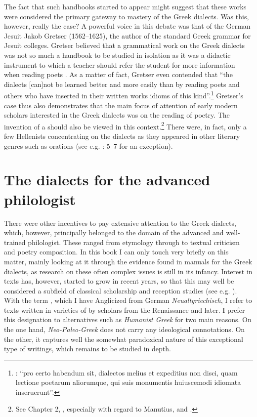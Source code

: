 The fact that such handbooks started to appear might suggest that these works were considered the primary gateway to mastery of the Greek dialects. Was this, however, really the case? A powerful voice in this debate was that of the German Jesuit Jakob Gretser (1562–1625), the author of the standard Greek grammar for Jesuit colleges. Gretser believed that a grammatical work on the Greek dialects was not so much a handbook to be studied in isolation as it was a didactic instrument to which a teacher should refer the student for more information when reading poets \citep[{\footnotesize)(}.5\textsc{\textsuperscript{v}}–\footnotesize{)(}.6\textsc{\textsuperscript{r}}]{Gretser1593}. As a matter of fact, Gretser even contended that “the dialects [can]not be learned better and more easily than by reading poets and others who have inserted in their written works idioms of this kind”.\footnote{\citet[)(.5\textsc{\textsuperscript{v}}]{Gretser1593}: “pro certo habendum sit, dialectos melius et expeditius non disci, quam lectione poetarum aliorumque, qui suis monumentis huiuscemodi idiomata inseruerunt”.} Gretser’s case thus also demonstrates that the main focus of attention of early modern scholars interested in the Greek dialects was on the reading of poetry. The invention of a  should also be viewed in this context.\footnote{See Chapter 2, , especially with regard to Manutius, and .} There were, in fact, only a few Hellenists concentrating on the dialects as they appeared in other literary genres such as orations (see e.g. \citealt{Labbe1639}: 5–7 for an exception).

\section{The dialects for the advanced philologist}\label{sec:3.2}

There were other incentives to pay extensive attention to the Greek dialects, which, however, principally belonged to the domain of the advanced and well-trained philologist. These ranged from etymology through to textual criticism and  poetry composition. In this book I can only touch very briefly on this matter, mainly looking at it through the evidence found in manuals for the Greek dialects, as research on these often complex issues is still in its infancy. Interest in  texts has, however, started to grow in recent years, so that this may well be considered a subfield of classical scholarship and reception studies (see e.g. \citealt{Pall2018}). With the term , which I have Anglicized from German \textit{Neualtgriechisch}, I refer to texts written in varieties of  by scholars from the Renaissance and later. I prefer this designation to alternatives such as \textit{Humanist Greek} for two main reasons. On the one hand, \textit{Neo-Paleo-Greek} does not carry any ideological connotations. On the other, it captures well the somewhat paradoxical nature of this exceptional type of writings, which remains to be studied in depth.


